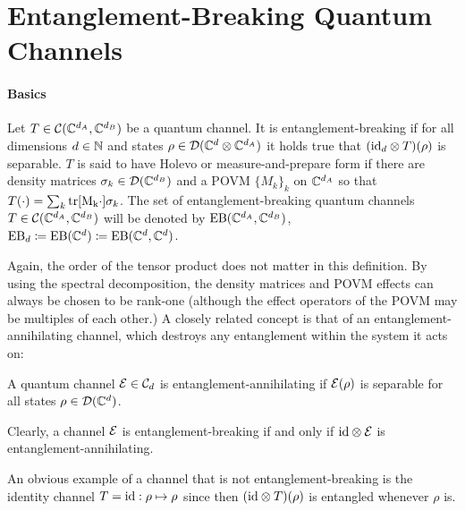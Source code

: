 \chapter{Entanglement-Breaking Quantum Channels}
\label{chap:4_entanglement}




\subsubsection{Basics}

\begin{definition}\label{def:eb}
    Let $T \in \mathcal C(\mathbb{C}^{d_A},\mathbb{C}^{d_B})$ be a quantum channel. It is entanglement-breaking if for all dimensions $d\in \mathbb{N}$ and states $\rho \in \mathcal D(\mathbb{C}^d \otimes \mathbb{C}^{d_A})$ it holds true that $(\mathrm{id}_d\otimes T)(\rho)$ is separable. $T$ is said to have Holevo or measure-and-prepare form if there are density matrices $\sigma_k \in \mathcal D(\mathbb{C}^{d_B})$ and a POVM $\{M_k\}_k$ on $\mathbb{C}^{d_A}$ so that $T(\cdot) = \sum_k \mathrm{tr[M_k \cdot ]}\sigma_k$. The set of entanglement-breaking quantum channels $T\in \mathcal C(\mathbb{C}^{d_A},\mathbb{C}^{d_B})$ will be denoted by $\text{EB}(\mathbb{C}^{d_A},\mathbb{C}^{d_B})$, $\text{EB}_d \coloneqq \text{EB}(\mathbb{C}^d)\coloneqq \text{EB}(\mathbb{C}^{d},\mathbb{C}^{d})$.
\end{definition}\noindent
Again, the order of the tensor product does not matter in this definition. By using the spectral decomposition, the density matrices and POVM effects can always be chosen to be rank-one (although the effect operators of the POVM may be multiples of each other.)
A closely related concept is that of an entanglement-annihilating channel, which destroys any entanglement within the system it acts on:
\begin{definition}
    A quantum channel $\mathcal E \in \mathcal C_d$ is entanglement-annihilating if $\mathcal E(\rho) $ is separable for all states $\rho \in \mathcal D(\mathbb{C}^d)$.
\end{definition}
Clearly, a channel $\mathcal E$ is entanglement-breaking if and only if $\mathrm{id} \otimes \mathcal E$ is entanglement-annihilating.

An obvious example of a channel that is not entanglement-breaking is the identity channel $T=\mathrm{id}: \rho \mapsto \rho$ since then $(\mathrm{id} \otimes T)(\rho)$ is entangled whenever $\rho$ is.

